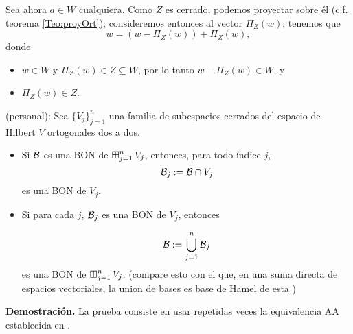 Sea ahora $a \in W$ cualquiera. 
Como $Z$ es cerrado, podemos proyectar sobre él (c.f. teorema
\ref{Teo:proyOrt}); consideremos entonces al vector
$\Pi_{Z}(w)$; tenemos que
\[
w= (w-\Pi_{Z}(w))+\Pi_{Z}(w),
\]
donde
\begin{itemize}
\item $ w \in W$ y $\Pi_{Z}(w) \in Z \subseteq W$, por lo tanto
$w-\Pi_{Z}(w) \in W$, y
\item $\Pi_{Z}(w) \in Z$.
\end{itemize}
\QEDB
\vspace{0.2cm}

\begin{lema} \label{lema: BONs de sumas ortogonales}
(personal): Sea $\{ V_{j} \}_{j=1}^{n}$ una familia
de subespacios cerrados del espacio de Hilbert $V$ ortogonales
dos a dos. 
\begin{itemize}
\item Si $\mathcal{B}$ es una BON de $\operatorname*{{\boxplus}}_{j =1 }^{n} V_{j}$,
entonces, para todo índice $j$,
\[
\mathcal{B}_{j}:= \mathcal{B} \cap V_{j}
\]
es una BON de $V_{j}$. 

\item Si para cada $j$, $\mathcal{B}_{j}$ es una
BON de $V_{j}$, entonces

\[
\mathcal{B}:= \bigcup\limits_{j=1}^{n}{\mathcal{B}_{j}}
\]
es una BON de $\operatorname*{{\boxplus}}_{j =1 }^{n} V_{j}$.
(compare esto con el que, en una suma directa
de espacios vectoriales, la union de bases es base de Hamel de esta
)
\end{itemize}
\end{lema}
\noindent
\textbf{Demostración.} La prueba consiste en usar
repetidas veces la equivalencia AA 
establecida en .
